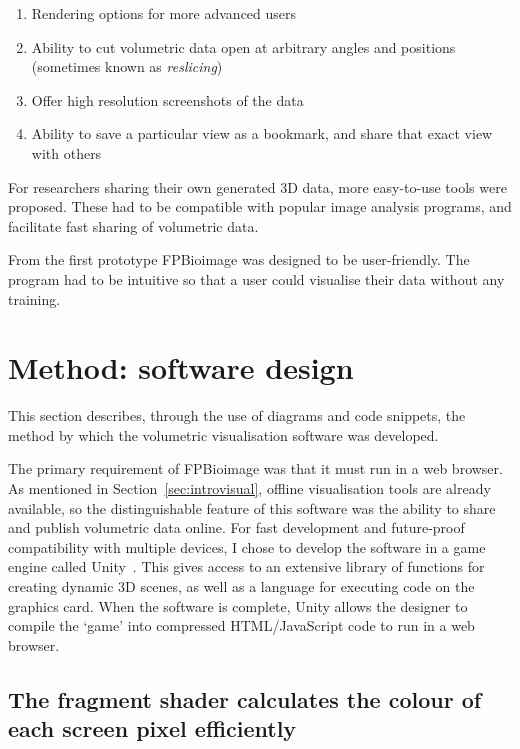 \begin{enumerate}
	\item Rendering options for more advanced users
	\item Ability to cut volumetric data open at arbitrary angles and positions (sometimes known as \textit{reslicing})
	\item Offer high resolution screenshots of the data
	\item Ability to save a particular view as a bookmark, and share that exact view with others
\end{enumerate}

For researchers sharing their own generated 3D data, more easy-to-use tools were proposed.
These had to be compatible with popular image analysis programs, and facilitate fast sharing of volumetric data.

From the first prototype FPBioimage was designed to be user-friendly.
The program had to be intuitive so that a user could visualise their data without any training.

\section{Method: software design} \label{sec:fpbSoftwareDesign}
This section describes, through the use of diagrams and code snippets, the method by which the volumetric visualisation software was developed.

The primary requirement of FPBioimage was that it must run in a web browser.
As mentioned in Section~\ref{sec:introvisual}, offline visualisation tools are already available, so the distinguishable feature of this software was the ability to share and publish volumetric data online.
For fast development and future-proof compatibility with multiple devices, I chose to develop the software in a game engine called Unity~\cite{unity}.
This gives access to an extensive library of functions for creating dynamic 3D scenes, as well as a language for executing code on the graphics card.
When the software is complete, Unity allows the designer to compile the `game' into compressed HTML/JavaScript code to run in a web browser.

\subsection{The fragment shader calculates the colour of each screen pixel efficiently} \label{sec:shader}

